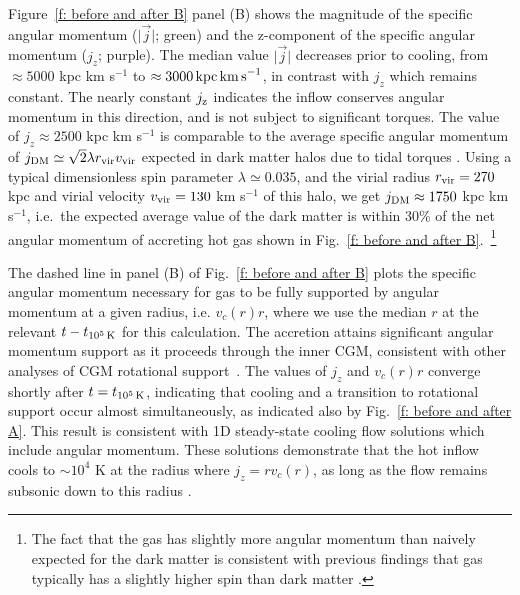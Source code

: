 \documentclass[fleqn,usenatbib]{mnras}
\newcommand{\tcon}{t_{10^5\,{\rm K}}}
\newcommand{\Rvir}{r_{\rm vir}}
\newcommand{\vvir}{v_{\rm vir}}
\begin{document}
Figure~\ref{f: before and after B} panel (B) shows the magnitude of the specific angular momentum ($\vert \vec j \vert$; green) and the z-component of the specific angular momentum ($j_z$; purple).
The median value $\vert \vec j \vert$ decreases prior to cooling, from $\approx 5000$ kpc km s$^{-1}$ to $\approx 3000\,{\rm kpc\,km\,s}^{-1}$, in contrast with  $j_z$ which remains constant.
The nearly constant $j_{\rm z}$ indicates the inflow conserves angular momentum in this direction, and is not subject to significant torques. 
The value of $j_z\approx 2500$ kpc km s$^{-1}$ is comparable to the average specific angular momentum of $j_{\rm DM} \simeq \sqrt{2}\lambda \Rvir \vvir$ expected in dark matter halos due to tidal torques \citep[e.g.][]{Bullock2001}.
Using a typical dimensionless spin parameter $\lambda \simeq 0.035$, and the virial radius $\Rvir=270$ kpc and virial velocity $\vvir=130$ km s$^{-1}$ of this halo, we get $j_{\rm DM}\approx1750$ kpc km s$^{-1}$, i.e.~the expected average value of the dark matter is within $30\%$ of the net angular momentum of accreting hot gas shown in Fig.~\ref{f: before and after B}.~\footnote{The fact that the gas has slightly more angular momentum than naively expected for the dark matter is consistent with previous findings that gas typically has a slightly higher spin than dark matter \citep[e.g.][]{Stewart2017}.}

The dashed line in panel (B) of Fig.~\ref{f: before and after B} plots the specific angular momentum necessary for gas to be fully supported by angular momentum at a given radius, i.e. $v_c(r)r$, where we use the median $r$ at the relevant $t-\tcon$ for this calculation.
The accretion attains significant angular momentum support as it proceeds through the inner CGM, consistent with other analyses of CGM rotational support~\citep{Oppenheimer2018}.
The values of $j_z$ and $v_c(r)r$ converge shortly after $t=\tcon$, indicating that cooling and a transition to rotational support occur almost simultaneously, as indicated also by Fig.~\ref{f: before and after A}.
This result is consistent with 1D steady-state cooling flow solutions which include angular momentum.
These solutions demonstrate that the hot inflow cools to $\sim10^4$ K at the radius where $j_z=r v_c(r)$, as long as the flow remains subsonic down to this radius \citep{Cowie1980, Stern2019}.

\end{document}

